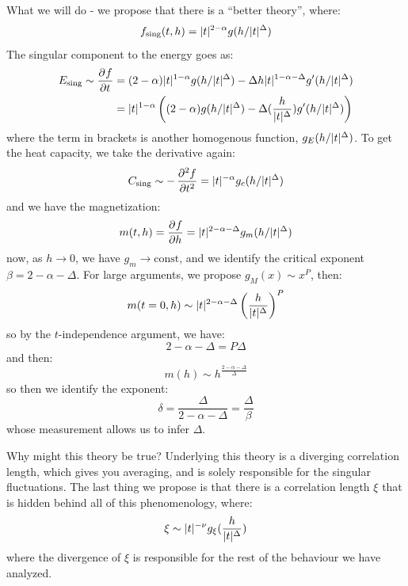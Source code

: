 What we will do - we propose that there is a ``better theory'', where:
\begin{equation}
    f_{\text{sing}}(t, h) = \lvert t \rvert^{2-\alpha}g(h/\lvert t \rvert^\Delta)
\end{equation}
The singular component to the energy goes as:
\begin{equation}
    \begin{split}
        E_{\text{sing}} \sim \dpd{f}{t} &= (2-\alpha)\abs{t}^{1-\alpha}g(h/\abs{t}^\Delta) - \Delta h \abs{t}^{1-\alpha-\Delta}g'(h/\abs{t}^\Delta)
        \\ &= \abs{t}^{1-\alpha}\left((2-\alpha)g(h/\abs{t}^\Delta) - \Delta(\frac{h}{\abs{t}^\Delta})g'(h/\abs{t}^\Delta)\right)
    \end{split}
\end{equation}
where the term in brackets is another homogenous function, $g_E(h/\lvert t \rvert^\Delta)$. To get the heat capacity, we take the derivative again:
\begin{equation}
    C_{\text{sing}} \sim -\dpd[2]{f}{t} = \abs{t}^{-\alpha}g_c(h/\abs{t}^\Delta)
\end{equation}
and we have the magnetization:
\begin{equation}
    m(t, h) = \dpd{f}{h} = \abs{t}^{2-\alpha-\Delta}g_m(h/\abs{t}^\Delta)
\end{equation}
now, as $h \to 0$, we have $g_m \to \text{const}$, and we identify the critical exponent $\beta = 2 - \alpha - \Delta$. For large arguments, we propose $g_M(x) \sim x^P$, then:
\begin{equation}
    m(t=0, h) \sim \lvert t \rvert^{2-\alpha-\Delta}\left(\frac{h}{\lvert t \rvert^\Delta}\right)^P
\end{equation} 
so by the $t$-independence argument, we have:
\begin{equation}
    2 - \alpha - \Delta = P\Delta
\end{equation}
and then:
\begin{equation}
    m(h) \sim h^{\frac{2-\alpha-\Delta}{\Delta}}
\end{equation}
so then we identify the exponent:
\begin{equation}
    \delta = \frac{\Delta}{2 - \alpha - \Delta} = \frac{\Delta}{\beta}
\end{equation}
whose measurement allows us to infer $\Delta$.

Why might this theory be true? Underlying this theory is a diverging correlation length, which gives you averaging, and is solely responsible for the singular fluctuations. The last thing we propose is that there is a correlation length $\xi$ that is hidden behind all of this phenomenology, where:
\begin{equation}
    \xi \sim \lvert t \rvert^{-\nu}g_\xi(\frac{h}{\lvert t \rvert^\Delta})
\end{equation}
where the divergence of $\xi$ is responsible for the rest of the behaviour we have analyzed. 

